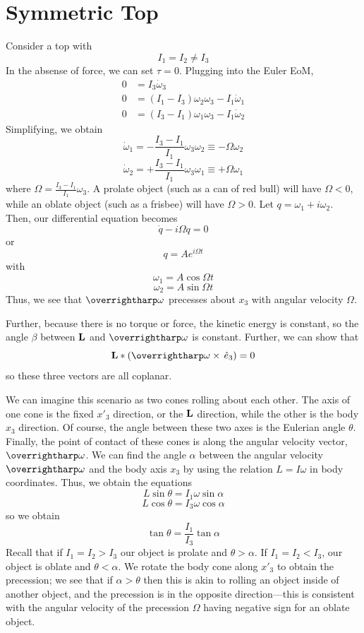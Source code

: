 \section{Symmetric Top}
Consider a top with
\[I_1=I_2 \neq I_3\]
In the absense of force, we can set \(\tau = 0\). Plugging into the Euler EoM,
\begin{align*}
	0&=I_3\dot\omega_3\\
	0&=(I_1-I_3)\omega_2\omega_3-I_1\dot\omega_1\\
	0&=(I_3-I_1)\omega_1\omega_3-I_1\dot\omega_2
\end{align*}
Simplifying, we obtain
\[\dot\omega_1 = -\frac{I_3-I_1}{I_1}\omega_3\omega_2\equiv -\Omega\omega_2\]
\[\dot\omega_2 = +\frac{I_3-I_1}{I_1}\omega_3\omega_1\equiv +\Omega\omega_1\]
where \(\Omega = \frac{I_3-I_1}{I_1}\omega_3\). A prolate object (such as a can of red bull) will have \(\Omega<0\), while an oblate object (such as a frisbee) will have \(\Omega>0\). Let
\(q = \omega_1+i\omega_2\). Then, our differential equation becomes
\[\dot q -i\Omega q =0\]
or 
\[q = Ae^{i\Omega t}\]
with 
\[\omega_1 = A\cos\Omega t\]
\[\omega_2 = A\sin\Omega t\]
Thus, we see that \(\vv\omega\) precesses about \(x_3\) with angular velocity \(\Omega\).

Further, because there is no torque or force, the kinetic energy is constant, so the angle \(\beta\) between \(\mathbf{L}\) and \(\vv\omega\) is constant. Further, we can show that 
\[\vb L*(\vv\omega\times\e3) = 0\]
so these three vectors are all coplanar.

\diagram{}

We can imagine this scenario as two cones rolling about each other. The axis of one cone is the fixed \(x'_3\) direction, or the \(\mathbf{L}\) direction, while the other is the body \(x_3\) direction. Of course, the angle between these two axes is the Eulerian angle \(\theta\). Finally, the point of contact of these cones is along the angular velocity vector, \(\vv\omega\). We can find the angle \(\alpha\) between the angular velocity \(\vv\omega\) and the body axis \(x_3\) by using the relation \(L = I\omega\) in body coordinates. Thus, we obtain the equations
\[L\sin\theta = I_1\omega \sin\alpha\]
\[L\cos\theta = I_3\omega\cos\alpha\]
so we obtain
\[\tan\theta = \frac{I_1}{I_3}\tan\alpha\]
Recall that if \(I_1 = I_2>I_3\) our object is prolate and \(\theta>\alpha\). If \(I_1=I_2< I_3\), our object is oblate and \(\theta<\alpha\). We rotate the body cone along \(x'_3\) to obtain the precession; we see that if \(\alpha>\theta\) then this is akin to rolling an object inside of another object, and the precession is in the opposite direction---this is consistent with the angular velocity of the precession \(\Omega\) having negative sign for an oblate object.

